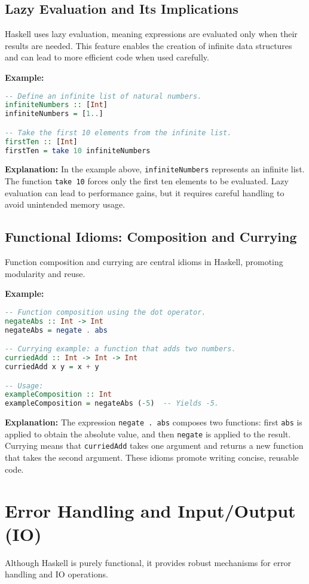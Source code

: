 \documentclass[11pt,a4paper]{article}
\begin{document}
\subsection{Lazy Evaluation and Its Implications}
Haskell uses lazy evaluation, meaning expressions are evaluated only when their results are needed. This feature enables the creation of infinite data structures and can lead to more efficient code when used carefully.

\textbf{Example:}
\begin{lstlisting}[language=Haskell]
-- Define an infinite list of natural numbers.
infiniteNumbers :: [Int]
infiniteNumbers = [1..]

-- Take the first 10 elements from the infinite list.
firstTen :: [Int]
firstTen = take 10 infiniteNumbers
\end{lstlisting}

\textbf{Explanation:}  
In the example above, \texttt{infiniteNumbers} represents an infinite list. The function \texttt{take 10} forces only the first ten elements to be evaluated. Lazy evaluation can lead to performance gains, but it requires careful handling to avoid unintended memory usage.

\subsection{Functional Idioms: Composition and Currying}
Function composition and currying are central idioms in Haskell, promoting modularity and reuse.

\textbf{Example:}
\begin{lstlisting}[language=Haskell]
-- Function composition using the dot operator.
negateAbs :: Int -> Int
negateAbs = negate . abs

-- Currying example: a function that adds two numbers.
curriedAdd :: Int -> Int -> Int
curriedAdd x y = x + y

-- Usage:
exampleComposition :: Int
exampleComposition = negateAbs (-5)  -- Yields -5.
\end{lstlisting}

\textbf{Explanation:}  
The expression \texttt{negate . abs} composes two functions: first \texttt{abs} is applied to obtain the absolute value, and then \texttt{negate} is applied to the result. Currying means that \texttt{curriedAdd} takes one argument and returns a new function that takes the second argument. These idioms promote writing concise, reusable code.

\section{Error Handling and Input/Output (IO)}
Although Haskell is purely functional, it provides robust mechanisms for error handling and IO operations.
\end{document}
